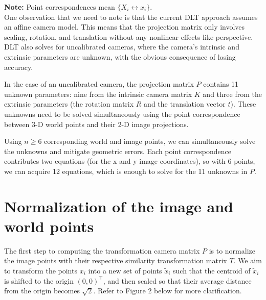 \documentclass[12pt]{article}
\begin{document}
\noindent \textbf{Note:} Point correspondences mean \( \{ X_i \leftrightarrow x_i \} \).\\

One observation that we need to note is that the current DLT approach assumes an affine camera model. This means that the projection matrix only involves scaling, rotation, and translation without any nonlinear effects like perspective. DLT also solves for uncalibrated cameras, where the camera's intrinsic and extrinsic parameters are unknown, with the obvious consequence of losing accuracy.

In the case of an uncalibrated camera, the projection matrix \( P \) contains 11 unknown parameters: nine from the intrinsic camera matrix \( K \) and three from the extrinsic parameters (the rotation matrix \( R \) and the translation vector \( t \)). These unknowns need to be solved simultaneously using the point correspondence between 3-D world points and their 2-D image projections.

Using \( n \geq 6 \) corresponding world and image points, we can simultaneously solve the unknowns and mitigate geometric errors. Each point correspondence contributes two equations (for the x and y image coordinates), so with 6 points, we can acquire 12 equations, which is enough to solve for the 11 unknowns in \( P \).

\section{Normalization of the image and world points}
The first step to computing the transformation camera matrix \( P \) is to normalize the image points with their respective similarity transformation matrix \( T\). We aim to transform the points \( x_i \) into a new set of points \( \tilde{x}_i \) such that the centroid of \( \tilde{x}_i \) is shifted to the origin \( (0, 0)^\top \), and then scaled so that their average distance from the origin becomes \( \sqrt{2} \). Refer to Figure 2 below for more clarification. \\
\end{document}
